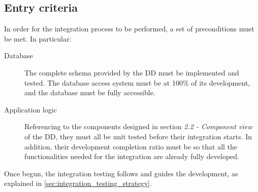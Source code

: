 \subsection{Entry criteria}
\label{sec:entry_criteria}
	In order for the integration process to be performed, a set of preconditions must be met. In particular:
	\begin{description}
		\item[Database] The complete schema provided by the DD must be implemented and tested. The database access system must be at 100\% of its development, and the database must be fully accessible.
		\item[Application logic] Referencing to the components designed in section \textit{2.2 - Component view} of the DD, they must all be unit tested before their integration starts. In addition, their development completion ratio must be so that all the functionalities needed for the integration are already fully developed. 
	\end{description}
	Once begun, the integration testing follows and guides the development, as explained in \autoref{sec:integration_testing_strategy}. %

